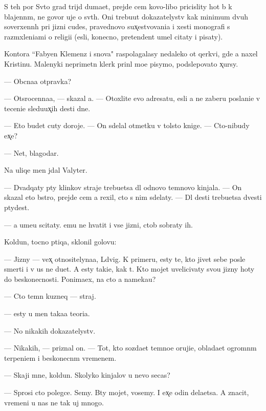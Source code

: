 \documentclass[10pt]{book}
\begin{document}
S teh por Sv{\ia}to{\y} grad trijd{\yi} duma{\y}et, prejde cem kovo-libo pricislity hot{\ia} b{\yi} k blajenn{\yi}m, ne govor{\ia} uje o sv{\ia}t{\yi}h. Oni trebu{\y}ut dokazatelystv kak minimum dvuh soverxenn{\yi}h pri jizni cudes, pravednovo sux̨estvovani{\y}a i xesti monografi{\y} s razm{\yi}xleni{\y}ami o religi{\y}i ({\y}esli, konecno, pretendent umel citaty i pisaty).

Kontora ``Fabyen Klemenz i s{\yi}nov{\y}a" raspolagalasy nedaleko ot qerkvi, gde {\y}a naxel Kristinu. Malenyki{\y} neprimetn{\yi}{\y} klerk prin{\ia}l mo{\y}e pisymo, podslepovato x̨ur{\ia}sy.

— Ob{\yi}cna{\y}a otpravka?

— Otsrocenna{\y}a, — skazal {\y}a. — Otoxlite {\y}evo adresatu, {\y}esli {\y}a ne zaberu poslani{\y}e v teceni{\y}e sledu{\y}ux̨ih des{\ia}ti dne{\y}.

— Eto budet cuty doroje. — On sdelal otmetku v tolsto{\y} knige. — Cto-nibudy {\y}ex̨e?

— Net, blagodar{\iu}.

Na uliqe men{\ia} jdal Valyter.

— Dvadqaty p{\ia}ty klinkov straje{\y} trebu{\y}etsa dl{\ia} odnovo temnovo kinjala. — On skazal eto b{\yi}stro, prejde cem {\y}a rexil, cto s nim sdelaty. — Dl{\ia} des{\ia}ti trebu{\y}etsa dvesti p{\ia}tydes{\ia}t.

— {\Y}a ume{\y}u scitaty. {\Y}emu ne hvatit i vse{\y} jizni, ctob{\yi} sobraty ih.

Koldun, tocno ptiqa, sklonil golovu:

— Jizny — vex̨ otnositelyna{\y}a, L{\iu}dvig. K primeru, {\y}esty te, kto jivet sebe posle smerti i v us ne du{\y}et. A {\y}esty taki{\y}e, kak t{\yi}. Kto mojet uvelicivaty svo{\y}u jizny hoty do beskonecnosti. Ponima{\y}ex, na cto {\y}a nameka{\y}u?

— Cto temn{\yi}{\y} kuzneq — straj.

— {\Y}esty u men{\ia} taka{\y}a teori{\y}a.

— No nikakih dokazatelystv.

— Nikakih, — priznal on. — Tot, kto sozda{\y}et temno{\y}e oruji{\y}e, oblada{\y}et ogromn{\yi}m terpeni{\y}em i beskonecn{\yi}m vremenem.

— Skaji mne, koldun. Skolyko kinjalov u nevo se{\y}cas?

— Sprosi cto polegce. Semy. B{\yi}ty mojet, vosemy. I {\y}ex̨e odin dela{\y}etsa. A znacit, vremeni u nas ne tak uj mnogo.
\end{document}
